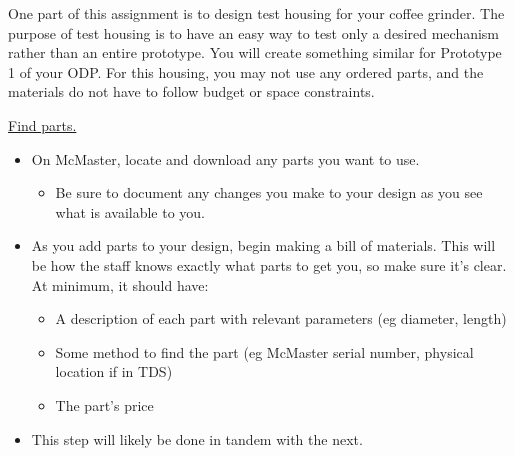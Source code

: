\documentclass[11pt,letterpaper]{article}
\begin{document}
\MakeHandoutHeader

One part of this assignment is to design test housing for your coffee grinder. The purpose of test housing is to have an easy way to test only a desired mechanism rather than an entire prototype. You will create something similar for Prototype 1 of your ODP. For this housing, you may not use any ordered parts, and the materials do not have to follow budget or space constraints.

\begin{AssignmentSteps}
  \item \underline{Find parts.}
  \begin{itemize}
    \item On McMaster, locate and download any parts you want to use.
    \begin{itemize}
      \item Be sure to document any changes you make to your design as you see what is available to you.
    \end{itemize}
    \item As you add parts to your design, begin making a bill of materials. This will be how the staff knows exactly what parts to get you, so make sure it's clear. At minimum, it should have:
    \begin{itemize}
      \item A description of each part with relevant parameters (eg diameter, length)
      \item Some method to find the part (eg McMaster serial number, physical location if in TDS)
      \item The part's price
    \end{itemize}
    \item This step will likely be done in tandem with the next.
  \end{itemize}


\end{AssignmentSteps}
\end{document}
